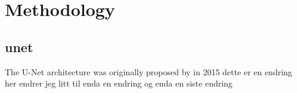 \documentclass[../main/thesis.tex]{subfiles}
\begin{document}
\section{Methodology}

\subsection{unet}
The U-Net architecture was originally proposed by \citeauthor{Ronneberger2015} in 2015 \cite{Ronneberger2015} dette er en endring her endrer jeg litt til enda en endring og enda en siste endring

\biblio
\end{document}
